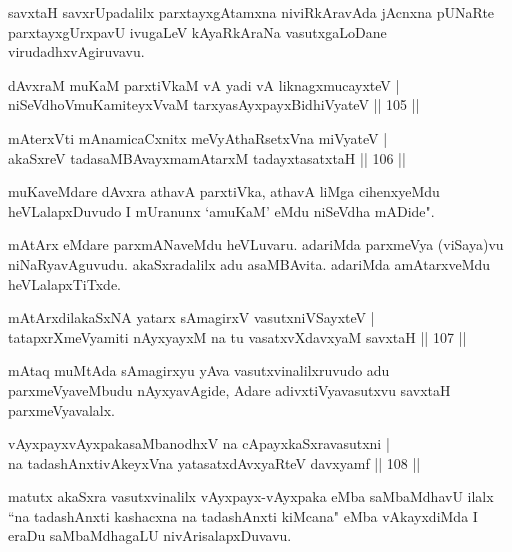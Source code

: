 \begin{artha}
savxtaH savxrUpadalilx parxtayxgAtamxna niviRkAravAda jAcnxna pUNaRte parxtayxgUrxpavU ivugaLeV kAyaRkAraNa vasutxgaLoDane virudadhxvAgiruvavu.
\end{artha}

\begin{shl}
dAvxraM muKaM parxtiVkaM vA yadi vA liknagxmucayxteV |\\
niSeVdhoV\s muKamiteyxVvaM tarxyasAyxpayxBidhiVyateV \hfill || 105 ||
\end{shl}

\begin{shl}
mAterxVti mAnamicaCxnitx meVyA\s thaRsetxVna miVyateV |\\
akaSxreV tadasaMBAvayxmamAtarxM tadayxtasatxtaH \hfill || 106 ||
\end{shl}

\begin{artha}
muKaveMdare dAvxra athavA parxtiVka, athavA liMga cihenxyeMdu heVLalapxDuvudo I mUranunx `amuKaM' eMdu niSeVdha mADide".
\end{artha}

\begin{artha}%
mAtArx eMdare parxmANaveMdu heVLuvaru. adariMda parxmeVya (viSaya)vu niNaRyavAguvudu. akaSxradalilx adu asaMBAvita. adariMda amAtarxveMdu heVLalapxTiTxde. 
\end{artha}

\begin{shl}
mAtArxdilakaSxNA yatarx sAmagirxV vasutxniVSayxteV |\\
tatapxrXmeVyamiti nAyxyayxM na tu vasatxvXdavxyaM savxtaH \hfill || 107 ||
\end{shl}

\begin{artha}
mAtaq muMtAda sAmagirxyu yAva vasutxvinalilxruvudo adu parxmeVyaveMbudu nAyxyavAgide, Adare adivxtiVyavasutxvu savxtaH parxmeVyavalalx.
\end{artha}

\begin{shl}
vAyxpayxvAyxpakasaMbanodhxV na cApayxkaSxravasutxni |\\
na tadashAnxtivAkeyxVna yatasatxdAvxyaRteV davxyamf \hfill || 108 ||
\end{shl}

\begin{artha}
matutx akaSxra vasutxvinalilx vAyxpayx-vAyxpaka eMba saMbaMdhavU ilalx ``na tadashAnxti kashacxna na tadashAnxti kiMcana" eMba vAkayxdiMda I eraDu saMbaMdhagaLU nivArisalapxDuvavu.
\end{artha}

